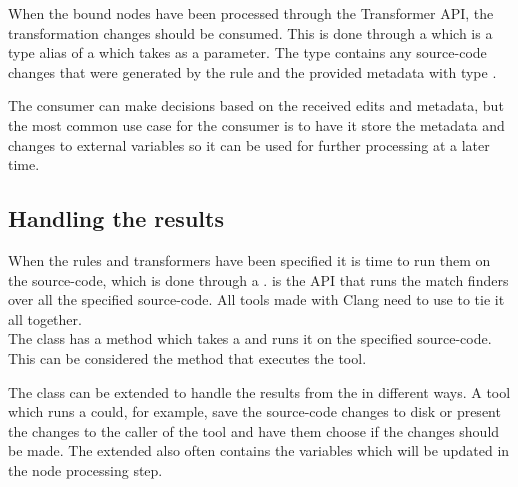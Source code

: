 When the bound nodes have been processed through the Transformer API, the transformation changes should be consumed. This is done through a  which is a type alias of a  which takes  as a parameter. The  type contains any source-code changes that were generated by the rule and the provided metadata with type .

The consumer can make decisions based on the received edits and metadata, but the most common use case for the consumer is to have it store the metadata and changes to external variables so it can be used for further processing at a later time.

\subsection{Handling the results} \label{subsec:080dev:HandlingToolResults}
When the rules and transformers have been specified it is time to run them on the source-code, which is done through a .  is the API that runs the match finders over all the specified source-code.
All tools made with Clang need to use  to tie it all together.\\
The  class has a  method which takes a  and runs it on the specified source-code.
This can be considered the method that executes the tool.

The  class can be extended to handle the results from the  in different ways. A tool which runs a  could, for example, save the source-code changes to disk or present the changes to the caller of the tool and have them choose if the changes should be made. The extended  also often contains the variables which will be updated in the node processing step.